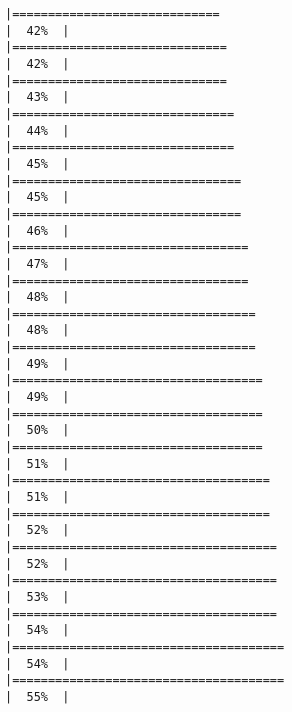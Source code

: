 \documentclass[
]{book}
\begin{document}
\begin{verbatim}
|=============================                                         |  42%  |                                                                              |==============================                                        |  42%  |                                                                              |==============================                                        |  43%  |                                                                              |===============================                                       |  44%  |                                                                              |===============================                                       |  45%  |                                                                              |================================                                      |  45%  |                                                                              |================================                                      |  46%  |                                                                              |=================================                                     |  47%  |                                                                              |=================================                                     |  48%  |                                                                              |==================================                                    |  48%  |                                                                              |==================================                                    |  49%  |                                                                              |===================================                                   |  49%  |                                                                              |===================================                                   |  50%  |                                                                              |===================================                                   |  51%  |                                                                              |====================================                                  |  51%  |                                                                              |====================================                                  |  52%  |                                                                              |=====================================                                 |  52%  |                                                                              |=====================================                                 |  53%  |                                                                              |=====================================                                 |  54%  |                                                                              |======================================                                |  54%  |                                                                              |======================================                                |  55%  |                                                                              
\end{verbatim}
\end{document}
